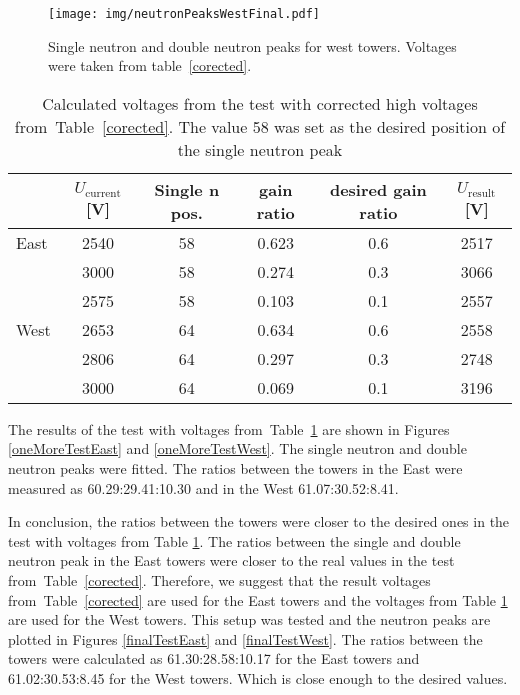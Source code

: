 \begin{figure}[htb]
\begin{center}
\texttt{[image: img/neutronPeaksWestFinal.pdf]}
\end{center}
\caption{Single neutron and double neutron peaks for west towers.
Voltages were taken from table~\ref{corected}.}
\label{westThird}
\end{figure}

\begin{table}[htb] 
\caption{Calculated voltages from the test with corrected high voltages from~Table~\ref{corected}.
The value 58 was set as the desired position of the single neutron peak}
\label{thirdCalib}
\begin{center}
\begin{tabular}{lccccc}
 \toprule
 &$U_\text{current}$[V]&Single n pos.&gain ratio&desired gain ratio&$U_\text{result}$[V]\\
\midrule
East  &2540  &58 &0.623  &0.6 &2517 \\
      &3000  &58 &0.274  &0.3 &3066 \\
      &2575  &58 &0.103	&0.1 &2557 \\
\midrule
West  &2653  &64 &0.634 &0.6 &2558 \\
      &2806  &64 &0.297 &0.3 &2748 \\
      &3000  &64 &0.069 &0.1 &3196 \\
\bottomrule
\end{tabular}
\end{center}
\end{table}

The results of the test with voltages from~Table~\ref{thirdCalib} are shown in
Figures \ref{oneMoreTestEast} and \ref{oneMoreTestWest}\@. The single neutron and double
neutron peaks were fitted. The ratios between the towers in the East were measured as
60.29:29.41:10.30 and in the West 61.07:30.52:8.41. 

In conclusion, the ratios between the towers were closer to the desired ones in the
test with voltages from Table \ref{thirdCalib}. The ratios between the single and double
neutron peak in the East towers were closer to the real values in the test
from~Table~\ref{corected}. Therefore, we suggest that the result voltages from~Table~\ref{corected}
are used for the East towers and the voltages from Table \ref{thirdCalib} are used for the
West towers. This setup was tested and the neutron peaks are plotted in Figures \ref{finalTestEast}
and \ref{finalTestWest}. The ratios between the towers were calculated as
61.30:28.58:10.17 for the East towers and 61.02:30.53:8.45 for the West towers.
Which is close enough to the desired values.

